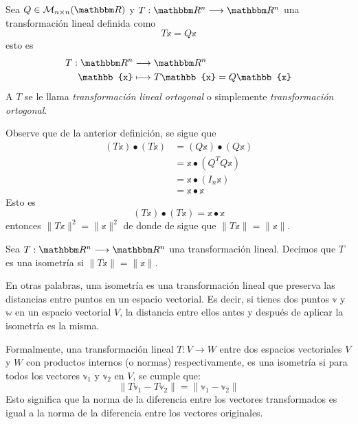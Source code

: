 \begin{definition}
    Sea $Q \in \mathcal{M}_{n \times n}(\RR)$ y $T:\RR[n] \longrightarrow \RR[n]$ una transformación lineal definida como
    $$T\mathbb{x} = Q\mathbb{x}$$
    esto es
    \begin{align*}
        T: \RR[n] & \longrightarrow \RR[n] \\
        \mathbb{x} & \longmapsto T\mathbb{x} = Q\mathbb{x}
    \end{align*}
    A $T$ se le llama \emph{transformación lineal ortogonal} o simplemente \emph{transformación ortogonal}.
\end{definition}

\begin{observation}
    Observe que de la anterior definición, se sigue que
    \begin{align*}
        (T\mathbb{x}) \bullet (T\mathbb{x}) & = (Q\mathbb{x}) \bullet (Q\mathbb{x}) \\
        & = \mathbb{x} \bullet \left( Q^T Q \mathbb{x} \right) \\
        & = \mathbb{x} \bullet (I_n \mathbb{x}) \\
        & = \mathbb{x} \bullet \mathbb{x}
    \end{align*}
    Esto es
    $$(T\mathbb{x}) \bullet (T\mathbb{x}) = \mathbb{x} \bullet \mathbb{x}$$
    entonces $\| T\mathbb{x} \|^2 = \| \mathbb{x} \|^2$ de donde de sigue que $\| T\mathbb{x} \| = \| \mathbb{x} \|$.
\end{observation}

\newpage

\begin{definition}
    Sea $T:\RR[n] \longrightarrow \RR[n]$ una transformación lineal. Decimos que $T$ es una isometría si $\| T\mathbb{x} \| = \| \mathbb{x} \|$.
\end{definition}

En otras palabras, una isometría es una transformación lineal que preserva las distancias entre puntos en un espacio vectorial. Es decir, si tienes dos puntos \( \mathbb{v} \) y \( \mathbb{w} \) en un espacio vectorial \( V \), la distancia entre ellos antes y después de aplicar la isometría es la misma.

Formalmente, una transformación lineal \( T: V \longrightarrow W \) entre dos espacios vectoriales \( V \) y \( W \) con productos internos (o normas) respectivamente, es una isometría si para todos los vectores \( \mathbb{v}_1 \) y \( \mathbb{v}_2 \) en \( V \), se cumple que:
$$\|T\mathbb{v}_1 - T\mathbb{v}_2\| = \|\mathbb{v}_1 - \mathbb{v}_2\|$$
Esto significa que la norma de la diferencia entre los vectores transformados es igual a la norma de la diferencia entre los vectores originales.

